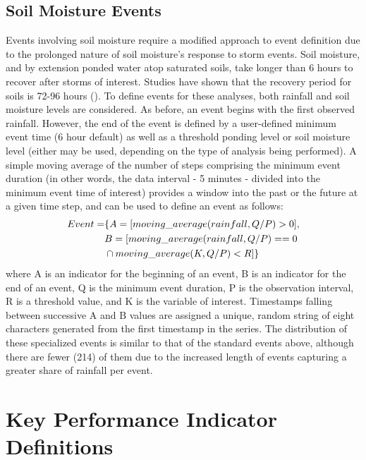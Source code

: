 \subsection{Soil Moisture Events}
Events involving soil moisture require a modified approach to event definition due to the prolonged nature of soil moisture's response to storm events.
Soil moisture, and by extension ponded water atop saturated soils, take longer than 6 hours to recover after storms of interest.
Studies have shown that the recovery period for soils is 72-96 hours (\cite{Davis2009,Wadzuk2017}).
To define events for these analyses, both rainfall and soil moisture levels are considered.
As before, an event begins with the first observed rainfall.
However, the end of the event is defined by a user-defined minimum event time (6 hour default) as well as a threshold ponding level or soil moisture level (either may be used, depending on the type of analysis being performed).
A simple moving average of the number of steps comprising the minimum event duration (in other words, the data interval - 5 minutes - divided into the minimum event time of interest) provides a window into the past or the future at a given time step, and can be used to define an event as follows:
\begin{equation}
	\begin{aligned}
		\centering
		Event = & \{ A = [ moving\_average(rainfall, Q / P) > 0 ], \\
				& B = [ moving\_average(rainfall, Q / P) == 0 \\
				& \cap moving\_average(K, Q / P) < R ] \}
	\end{aligned}
	\label{eq:alt-event-definition}
\end{equation}
where A is an indicator for the beginning of an event, B is an indicator for the end of an event, Q is the minimum event duration, P is the observation interval, R is a threshold value, and K is the variable of interest.
Timestamps falling between successive A and B values are assigned a unique, random string of eight characters generated from the first timestamp in the series.
The distribution of these specialized events is similar to that of the standard events above, although there are fewer (214) of them due to the increased length of events capturing a greater share of rainfall per event.

\section{Key Performance Indicator Definitions}

